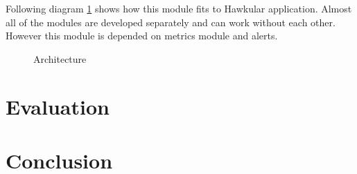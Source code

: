 Following diagram \ref{img_arch} shows how this module fits to Hawkular application.
Almost all of the modules are developed separately and can work without each
other. However this module is depended on metrics module and alerts. 
\begin{figure}[H]
    \begin{center}
        \caption{Architecture}
        \label{img_arch}
    \end{center}
\end{figure}

\chapter{Evaluation}
\chapter{Conclusion}
\cite{rfc_owamp} %

